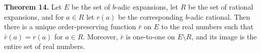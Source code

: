 \textbf{Theorem 14.} Let $E$ be the set of $b$-adic expansions, let $R$ be the set of rational expansions, and for $a \in R$ let $r(a)$ be the corresponding $b$-adic rational. Then there is a unique order-preserving function $\bar{r}$ on $E$ to the real numbers such that $\bar{r}(a) = r(a)$ for $a \in R$. Moreover, $\bar{r}$ is one-to-one on $E \setminus R$, and its image is the entire set of real numbers.
